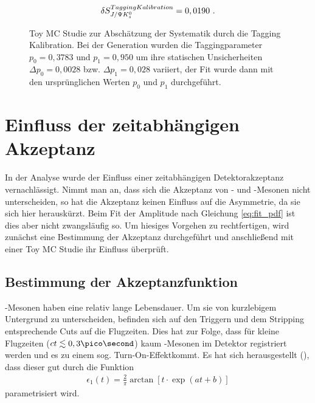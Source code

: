 \begin{align}
\delta S_{J/\Psi K_s^0}^{Tagging Kalibration} = 0,0190 \ .
\end{align}

\begin{figure}[hptb]
\caption{Toy MC Studie zur Abschätzung der Systematik durch die Tagging Kalibration. Bei der Generation wurden die Taggingparameter $p_0=0,3783$ und $p_1=0,950$ um ihre statischen Unsicherheiten $\Delta p_0 = 0,0028$ bzw. $\Delta p_1 = 0,028$ variiert, der Fit wurde dann mit den ursprünglichen Werten $p_0$ und $p_1$ durchgeführt.}
\label{fig:toys_tag_calib}
\end{figure}



\section{Einfluss der zeitabhängigen Akzeptanz}
In der Analyse wurde der Einfluss einer zeitabhängigen Detektorakzeptanz vernachlässigt. Nimmt man an, dass sich die Akzeptanz von \Bd- und \Bdbar-Mesonen nicht unterscheiden, so hat die Akzeptanz keinen Einfluss auf die Asymmetrie, da sie sich hier herauskürzt. Beim Fit der Amplitude nach Gleichung \ref{eq:fit_pdf} ist dies aber nicht zwangsläufig so. Um hiesiges Vorgehen zu rechtfertigen, wird zunächst eine Bestimmung der Akzeptanz durchgeführt und anschließend mit einer Toy MC Studie ihr Einfluss überprüft.

\subsection{Bestimmung der Akzeptanzfunktion} \label{kap:akzeptanz_bestimmung}
\Bd-Mesonen haben eine relativ lange Lebensdauer. Um sie von kurzlebigem Untergrund zu unterscheiden, befinden sich auf den Triggern und dem Stripping entsprechende Cuts auf die Flugzeiten. Dies hat zur Folge, dass für kleine Flugzeiten ($ct \lesssim 0,3\pico\second$) kaum \Bd-Mesonen im Detektor registriert werden und es zu einem sog. \glqq Turn-On-Effekt\grqq kommt. Es hat sich herausgestellt (\cite{lhcb-paper}), dass dieser gut durch die Funktion
\begin{align}
\epsilon_1(t) = \frac{2}{\pi}\arctan[t\cdot \exp(at+b)]
\end{align}
parametrisiert wird.

